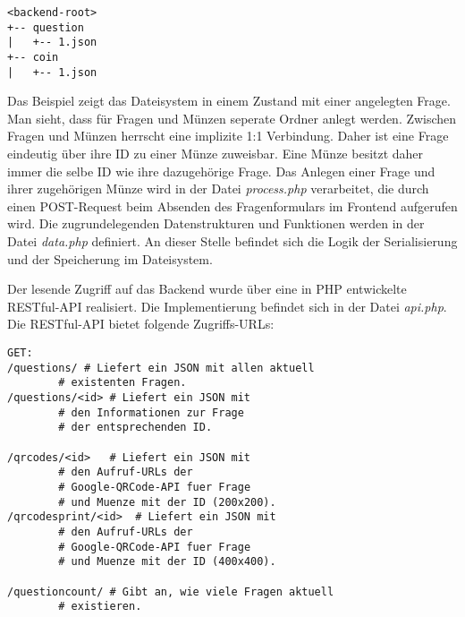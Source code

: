\begin{verbatim}
<backend-root>
+-- question
|   +-- 1.json
+-- coin
|   +-- 1.json
\end{verbatim}

Das Beispiel zeigt das Dateisystem in einem Zustand mit einer angelegten Frage. Man sieht, dass für Fragen und Münzen seperate Ordner anlegt werden. Zwischen Fragen und Münzen herrscht eine implizite 1:1 Verbindung. Daher ist eine Frage eindeutig über ihre ID zu einer Münze zuweisbar. Eine Münze besitzt daher immer die selbe ID wie ihre dazugehörige Frage.
Das Anlegen einer Frage und ihrer zugehörigen Münze wird in der Datei \emph{process.php} verarbeitet, die durch einen POST-Request beim Absenden des Fragenformulars im Frontend aufgerufen wird. Die zugrundelegenden Datenstrukturen und Funktionen werden in der Datei \emph{data.php} definiert. An dieser Stelle befindet sich die Logik der Serialisierung und der Speicherung im Dateisystem.

Der lesende Zugriff auf das Backend wurde über eine in PHP entwickelte RESTful-API realisiert. Die Implementierung befindet sich in der Datei \emph{api.php}.
Die RESTful-API bietet folgende Zugriffs-URLs:

 \begin{lstlisting}
GET:
/questions/	# Liefert ein JSON mit allen aktuell
		# existenten Fragen.
/questions/<id>	# Liefert ein JSON mit 
		# den Informationen zur Frage
		# der entsprechenden ID.

/qrcodes/<id>	# Liefert ein JSON mit 
		# den Aufruf-URLs der
		# Google-QRCode-API fuer Frage
		# und Muenze mit der ID (200x200).
/qrcodesprint/<id>	# Liefert ein JSON mit 
		# den Aufruf-URLs der
		# Google-QRCode-API fuer Frage
		# und Muenze mit der ID (400x400).

/questioncount/	# Gibt an, wie viele Fragen aktuell 
		# existieren.

DELETE:
/questions/<id>	# Loescht die Frage mit der 
		# angegebenen ID.
\end{lstlisting}

%
%
%

